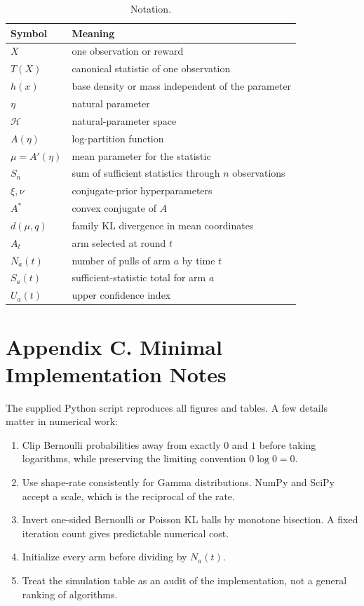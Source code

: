 \documentclass[en,nofont,11pt]{elegantbook}
\begin{document}
\begin{table}[H]
\centering
\caption*{Notation.}
\begin{tabular}{p{}p{}}
\toprule
Symbol & Meaning \\
\midrule
$X$ & one observation or reward \\
$T(X)$ & canonical statistic of one observation \\
$h(x)$ & base density or mass independent of the parameter \\
$\eta$ & natural parameter \\
$\mathcal H$ & natural-parameter space \\
$A(\eta)$ & log-partition function \\
$\mu=A'(\eta)$ & mean parameter for the statistic \\
$S_n$ & sum of sufficient statistics through $n$ observations \\
$\xi,\nu$ & conjugate-prior hyperparameters \\
$A^*$ & convex conjugate of $A$ \\
$d(\mu,q)$ & family KL divergence in mean coordinates \\
$A_t$ & arm selected at round $t$ \\
$N_a(t)$ & number of pulls of arm $a$ by time $t$ \\
$S_a(t)$ & sufficient-statistic total for arm $a$ \\
$U_a(t)$ & upper confidence index \\
\bottomrule
\end{tabular}
\end{table}

\chapter*{Appendix C. Minimal Implementation Notes}

The supplied Python script reproduces all figures and tables. A few details matter in numerical work:

\begin{enumerate}
\item Clip Bernoulli probabilities away from exactly $0$ and $1$ before taking logarithms, while preserving the limiting convention $0\log0=0$.
\item Use shape-rate consistently for Gamma distributions. NumPy and SciPy accept a scale, which is the reciprocal of the rate.
\item Invert one-sided Bernoulli or Poisson KL balls by monotone bisection. A fixed iteration count gives predictable numerical cost.
\item Initialize every arm before dividing by $N_a(t)$.
\item Treat the simulation table as an audit of the implementation, not a general ranking of algorithms.
\end{enumerate}
\end{document}
